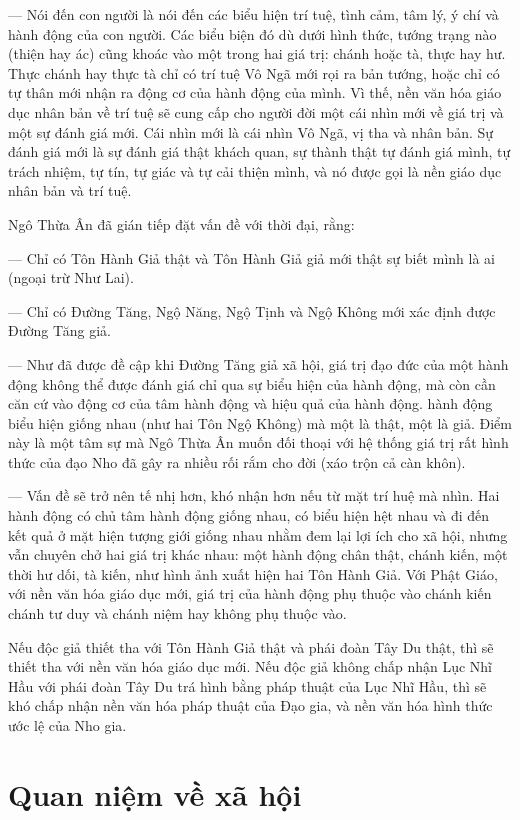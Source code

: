 — Nói đến con người là nói đến các biểu hiện trí tuệ, tình cảm, tâm lý, ý chí và hành động của con người. Các biểu biện đó dù dưới hình thức, tướng trạng nào (thiện hay ác) cũng khoác vào một trong hai giá trị: chánh hoặc tà, thực hay hư. Thực chánh hay thực tà chỉ có trí tuệ Vô Ngã mới rọi ra bản tướng, hoặc chỉ có tự thân mới nhận ra động cơ của hành động của mình. Vì thế, nền văn hóa giáo dục nhân bản về trí tuệ sẽ cung cấp cho người đời một cái nhìn mới về giá trị và một sự đánh giá mới. Cái nhìn mới là cái nhìn Vô Ngã, vị tha và nhân bản. Sự đánh giá mới là sự đánh giá thật khách quan, sự thành thật tự đánh giá mình, tự trách nhiệm, tự tín, tự giác và tự cải thiện mình, và nó được gọi là nền giáo dục nhân bản và trí tuệ.

Ngô Thừa Ân đã gián tiếp đặt vấn đề với thời đại, rằng:

— Chỉ có Tôn Hành Giả thật và Tôn Hành Giả giả mới thật sự biết mình là ai (ngoại trừ Như Lai).

— Chỉ có Đường Tăng, Ngộ Năng, Ngộ Tịnh và Ngộ Không mới xác định được Đường Tăng giả.

— Như đã được đề cập khi Đường Tăng giả xã hội, giá trị đạo đức của một hành động không thể được đánh giá chỉ qua sự biểu hiện của hành động, mà còn cần căn cứ vào động cơ của tâm hành động và hiệu quả của hành động. hành động biểu hiện giống nhau (như hai Tôn Ngộ Không) mà một là thật, một là giả. Điểm này là một tâm sự mà Ngô Thừa Ân muốn đối thoại với hệ thống giá trị rất hình thức của đạo Nho đã gây ra nhiều rối rắm cho đời (xáo trộn cả càn khôn).

— Vấn đề sẽ trở nên tế nhị hơn, khó nhận hơn nếu từ mặt trí huệ mà nhìn. Hai hành động có chủ tâm hành động giống nhau, có biểu hiện hệt nhau và đi đến kết quả ở mặt hiện tượng giới giống nhau nhằm đem lại lợi ích cho xã hội, nhưng vẫn chuyên chở hai giá trị khác nhau: một hành động chân thật, chánh kiến, một thời hư dối, tà kiến, như hình ảnh xuất hiện hai Tôn Hành Giả. Với Phật Giáo, với nền văn hóa giáo dục mới, giá trị của hành động phụ thuộc vào chánh kiến chánh tư duy và chánh niệm hay không phụ thuộc vào.

Nếu độc giả thiết tha với Tôn Hành Giả thật và phái đoàn Tây Du thật, thì sẽ thiết tha với nền văn hóa giáo dục mới. Nếu độc giả không chấp nhận Lục Nhĩ Hầu với phái đoàn Tây Du trá hình bằng pháp thuật của Lục Nhĩ Hầu, thì sẽ khó chấp nhận nền văn hóa pháp thuật của Đạo gia, và nền văn hóa hình thức ước lệ của Nho gia.

\section{Quan niệm về xã hội} %
\label{sec:56_57_xa_hoi}

